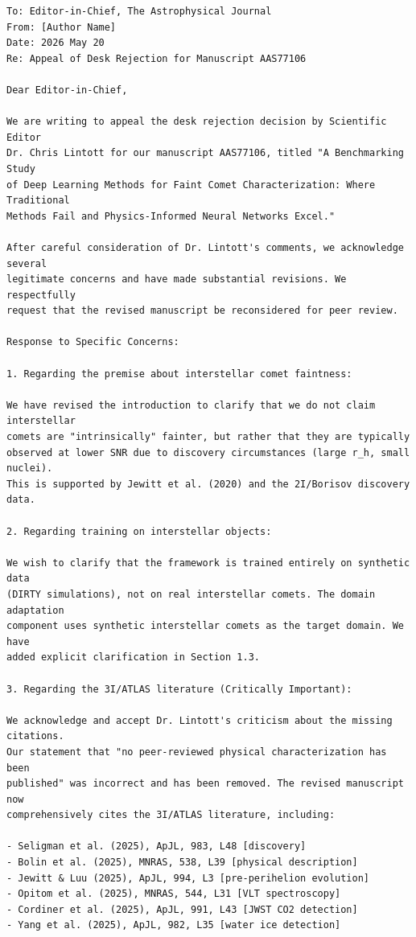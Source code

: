 \documentclass[12pt,a4paper]{article}
\begin{document}
\begin{verbatim}
To: Editor-in-Chief, The Astrophysical Journal
From: [Author Name]
Date: 2026 May 20
Re: Appeal of Desk Rejection for Manuscript AAS77106

Dear Editor-in-Chief,

We are writing to appeal the desk rejection decision by Scientific Editor
Dr. Chris Lintott for our manuscript AAS77106, titled "A Benchmarking Study
of Deep Learning Methods for Faint Comet Characterization: Where Traditional
Methods Fail and Physics-Informed Neural Networks Excel."

After careful consideration of Dr. Lintott's comments, we acknowledge several
legitimate concerns and have made substantial revisions. We respectfully
request that the revised manuscript be reconsidered for peer review.

Response to Specific Concerns:

1. Regarding the premise about interstellar comet faintness:

We have revised the introduction to clarify that we do not claim interstellar
comets are "intrinsically" fainter, but rather that they are typically
observed at lower SNR due to discovery circumstances (large r_h, small nuclei).
This is supported by Jewitt et al. (2020) and the 2I/Borisov discovery data.

2. Regarding training on interstellar objects:

We wish to clarify that the framework is trained entirely on synthetic data
(DIRTY simulations), not on real interstellar comets. The domain adaptation
component uses synthetic interstellar comets as the target domain. We have
added explicit clarification in Section 1.3.

3. Regarding the 3I/ATLAS literature (Critically Important):

We acknowledge and accept Dr. Lintott's criticism about the missing citations.
Our statement that "no peer-reviewed physical characterization has been
published" was incorrect and has been removed. The revised manuscript now
comprehensively cites the 3I/ATLAS literature, including:

- Seligman et al. (2025), ApJL, 983, L48 [discovery]
- Bolin et al. (2025), MNRAS, 538, L39 [physical description]
- Jewitt & Luu (2025), ApJL, 994, L3 [pre-perihelion evolution]
- Opitom et al. (2025), MNRAS, 544, L31 [VLT spectroscopy]
- Cordiner et al. (2025), ApJL, 991, L43 [JWST CO2 detection]
- Yang et al. (2025), ApJL, 982, L35 [water ice detection]


\end{verbatim}
\end{document}
